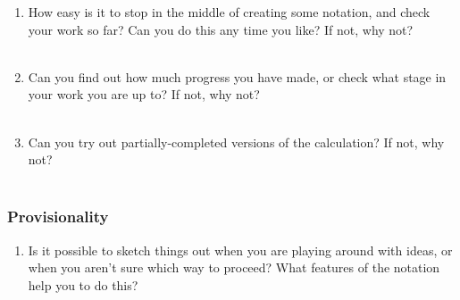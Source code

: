 \documentclass[14pt]{article}
\newcommand{\answerbox}{
\fbox{
\begin{minipage}{16cm}
\hfill\vspace{2cm}
\end{minipage}
}\\
}
\begin{document}
\begin{enumerate}
\item How easy is it to stop in the middle of creating some notation, and check your work so far? Can you do this any time you like? If not, why not?\\
\answerbox
\item Can you find out how much progress you have made, or check what stage in your work you are up to? If not, why not?\\
\answerbox

\pagebreak

\item Can you try out partially-completed versions of the calculation? If not, why not?\\
\answerbox
\end{enumerate}

\subsubsection{Provisionality}

\begin{enumerate}
\item Is it possible to sketch things out when you are playing around with ideas, or when you aren’t sure which way to proceed? What features of the notation help you to do this?\\
\answerbox
\end{enumerate}

%
\end{document}
